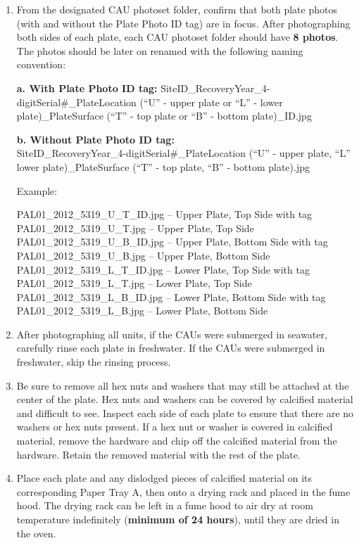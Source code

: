 \documentclass[]{book}
\begin{document}
\begin{enumerate}
\def\labelenumi{\arabic{enumi}.}
\setcounter{enumi}{8}
\item
  From the designated CAU photoset folder, confirm that both plate photos (with and without the Plate Photo ID tag) are in focus. After photographing both sides of each plate, each CAU photoset folder should have \textbf{8 photos}. The photos should be later on renamed with the following naming convention:

  \textbf{a. With Plate Photo ID tag:}
  SiteID\_RecoveryYear\_4-digitSerial\#\_PlateLocation (``U'' - upper plate or ``L'' - lower plate)\_PlateSurface (``T'' - top plate or ``B'' - bottom plate)\_ID.jpg

  \textbf{b. Without Plate Photo ID tag:}\\
  SiteID\_RecoveryYear\_4-digitSerial\#\_PlateLocation (``U'' - upper plate, ``L'' lower plate)\_PlateSurface (``T'' - top plate, ``B'' - bottom plate).jpg

  Example:

  PAL01\_2012\_5319\_U\_T\_ID.jpg -- Upper Plate, Top Side with tag\\
  PAL01\_2012\_5319\_U\_T.jpg -- Upper Plate, Top Side\\
  PAL01\_2012\_5319\_U\_B\_ID.jpg -- Upper Plate, Bottom Side with tag\\
  PAL01\_2012\_5319\_U\_B.jpg -- Upper Plate, Bottom Side\\
  PAL01\_2012\_5319\_L\_T\_ID.jpg -- Lower Plate, Top Side with tag\\
  PAL01\_2012\_5319\_L\_T.jpg -- Lower Plate, Top Side\\
  PAL01\_2012\_5319\_L\_B\_ID.jpg -- Lower Plate, Bottom Side with tag\\
  PAL01\_2012\_5319\_L\_B.jpg -- Lower Plate, Bottom Side
\item
  After photographing all units, if the CAUs were submerged in seawater, carefully rinse each plate in freshwater. If the CAUs were submerged in freshwater, skip the rinsing process.
\item
  Be sure to remove all hex nuts and washers that may still be attached at the center of the plate. Hex nuts and washers can be covered by calcified material and difficult to see. Inspect each side of each plate to ensure that there are no washers or hex nuts present. If a hex nut or washer is covered in calcified material, remove the hardware and chip off the calcified material from the hardware. Retain the removed material with the rest of the plate.
\item
  Place each plate and any dislodged pieces of calcified material on its corresponding Paper Tray A, then onto a drying rack and placed in the fume hood. The drying rack can be left in a fume hood to air dry at room temperature indefinitely (\textbf{minimum of 24 hours}), until they are dried in the oven.
\end{enumerate}
\end{document}

